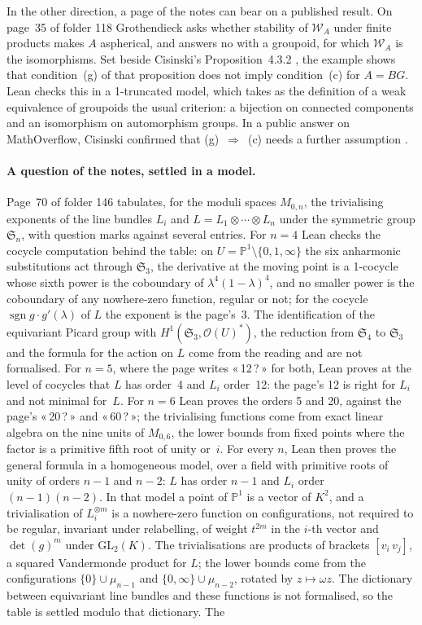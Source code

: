 \documentclass[runningheads,a4paper]{llncs}
\newcommand{\q}[1]{«\,#1\,»}
\begin{document}
In the other direction, a page of the notes can bear on a published result. On page~35 of folder 118 Grothendieck asks whether stability of $\mathcal W_A$ under finite products makes $A$ aspherical, and answers no with a groupoid, for which $\mathcal W_A$ is the isomorphisms. Set beside Cisinski's Proposition~4.3.2 \cite{cisinski2006}, the example shows that condition~(g) of that proposition does not imply condition~(c) for $A = BG$. Lean checks this in a 1-truncated model, which takes as the definition of a weak equivalence of groupoids the usual criterion: a bijection on connected components and an isomorphism on automorphism groups. In a public answer on MathOverflow, Cisinski confirmed that (g)~$\Rightarrow$~(c) needs a further assumption \cite{cisinskimo2026}.

\paragraph{A question of the notes, settled in a model.} Page~70 of folder 146 tabulates, for the moduli spaces $M_{0,n}$, the trivialising exponents of the line bundles $L_i$ and $L = L_1 \otimes \cdots \otimes L_n$ under the symmetric group $\mathfrak S_n$, with question marks against several entries. For $n = 4$ Lean checks the cocycle computation behind the table: on $U = \mathbb P^1 \setminus \{0,1,\infty\}$ the six anharmonic substitutions act through $\mathfrak S_3$, the derivative at the moving point is a 1-cocycle whose sixth power is the coboundary of $\lambda^4(1-\lambda)^4$, and no smaller power is the coboundary of any nowhere-zero function, regular or not; for the cocycle $\operatorname{sgn} g \cdot g'(\lambda)$ of $L$ the exponent is the page's~3. The identification of the equivariant Picard group with $H^1(\mathfrak S_3, \mathcal O(U)^*)$, the reduction from $\mathfrak S_4$ to $\mathfrak S_3$ and the formula for the action on $L$ come from the reading and are not formalised. For $n = 5$, where the page writes \q{12\,?} for both, Lean proves at the level of cocycles that $L$ has order~4 and $L_i$ order~12: the page's 12 is right for $L_i$ and not minimal for~$L$. For $n = 6$ Lean proves the orders 5 and 20, against the page's \q{20\,?} and \q{60\,?}; the trivialising functions come from exact linear algebra on the nine units of $M_{0,6}$, the lower bounds from fixed points where the factor is a primitive fifth root of unity or~$i$. For every $n$, Lean then proves the general formula in a homogeneous model, over a field with primitive roots of unity of orders $n-1$ and $n-2$: $L$ has order $n-1$ and $L_i$ order $(n-1)(n-2)$. In that model a point of $\mathbb P^1$ is a vector of $K^2$, and a trivialisation of $L_i^{\otimes m}$ is a nowhere-zero function on configurations, not required to be regular, invariant under relabelling, of weight $t^{2m}$ in the $i$-th vector and $\det(g)^m$ under $\mathrm{GL}_2(K)$. The trivialisations are products of brackets $[v_i\,v_j]$, a squared Vandermonde product for $L$; the lower bounds come from the configurations $\{0\} \cup \mu_{n-1}$ and $\{0,\infty\} \cup \mu_{n-2}$, rotated by $z \mapsto \omega z$. The dictionary between equivariant line bundles and these functions is not formalised, so the table is settled modulo that dictionary. The 
\end{document}
